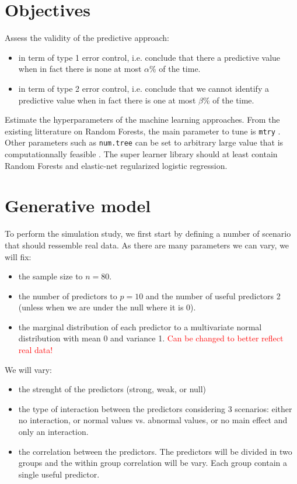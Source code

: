 \documentclass[12pt]{article}
\begin{document}
\section{Objectives}
\label{sec:orgc438ed4}

Assess the validity of the predictive approach:
\begin{itemize}
\item in term of type 1 error control, i.e. conclude that there a predictive
value when in fact there is none at most \(\alpha\)\% of the time.
\item in term of type 2 error control, i.e. conclude that we cannot identify a predictive
value when in fact there is one at most \(\beta\)\% of the time.
\end{itemize}

\bigskip

Estimate the hyperparameters of the machine learning
approaches. \newline From the existing litterature on Random Forests,
the main parameter to tune is \texttt{mtry}
\cite{probst2019hyperparameters}. Other parameters such as \texttt{num.tree}
can be set to arbitrary large value that is computationnally feasible
\citep{probst2017tune}.  \newline The super learner library should at
least contain Random Forests and elastic-net regularized logistic
regression.

\section{Generative model}
\label{sec:org7adfff6}

To perform the simulation study, we first start by defining a number
of scenario that should ressemble real data. As there are many parameters we can vary, we will fix:
\begin{itemize}
\item the sample size to \(n=80\).
\item the number of predictors to \(p=10\) and the number of useful
predictors 2 (unless when we are under the null where it is 0).
\item the marginal distribution of each predictor to a multivariate normal
distribution with mean 0 and variance 1. \textcolor{red}{Can
  be changed to better reflect real data!}
\end{itemize}
We will vary:
\begin{itemize}
\item the strenght of the predictors (strong, weak, or null)
\item the type of interaction between the predictors considering 3
scenarios: either no interaction, or normal values vs. abnormal
values, or no main effect and only an interaction.
\item the correlation between the predictors. The predictors will be
divided in two groups and the within group correlation will be
vary. Each group contain a single useful predictor.
\end{itemize}
\end{document}
